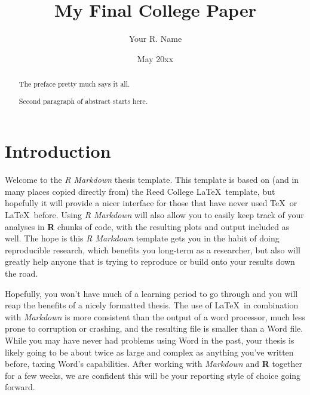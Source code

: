 \documentclass[12pt,twoside]{reedthesis}
\title{My Final College Paper}
\author{Your R. Name}
\date{May 20xx}
\begin{document}
      \maketitle
  
  \frontmatter %
  \pagestyle{empty} %

  
  
      \hypersetup{linkcolor=black}
    \setcounter{tocdepth}{2}
    \tableofcontents
  
  
  
      \begin{abstract}
      The preface pretty much says it all. \par  Second paragraph of abstract
      starts here.
    \end{abstract}
  
  
  \mainmatter %
  \pagestyle{fancyplain} %

  \chapter*{Introduction}\label{introduction}
  
  Welcome to the \emph{R Markdown} thesis template. This template is based
  on (and in many places copied directly from) the Reed College
  \LaTeX~template, but hopefully it will provide a nicer interface for
  those that have never used \TeX~or \LaTeX~before. Using \emph{R
  Markdown} will also allow you to easily keep track of your analyses in
  \textbf{R} chunks of code, with the resulting plots and output included
  as well. The hope is this \emph{R Markdown} template gets you in the
  habit of doing reproducible research, which benefits you long-term as a
  researcher, but also will greatly help anyone that is trying to
  reproduce or build onto your results down the road.
  
  Hopefully, you won't have much of a learning period to go through and
  you will reap the benefits of a nicely formatted thesis. The use of
  \LaTeX~in combination with \emph{Markdown} is more consistent than the
  output of a word processor, much less prone to corruption or crashing,
  and the resulting file is smaller than a Word file. While you may have
  never had problems using Word in the past, your thesis is likely going
  to be about twice as large and complex as anything you've written
  before, taxing Word's capabilities. After working with \emph{Markdown}
  and \textbf{R} together for a few weeks, we are confident this will be
  your reporting style of choice going forward.
  
\end{document}
